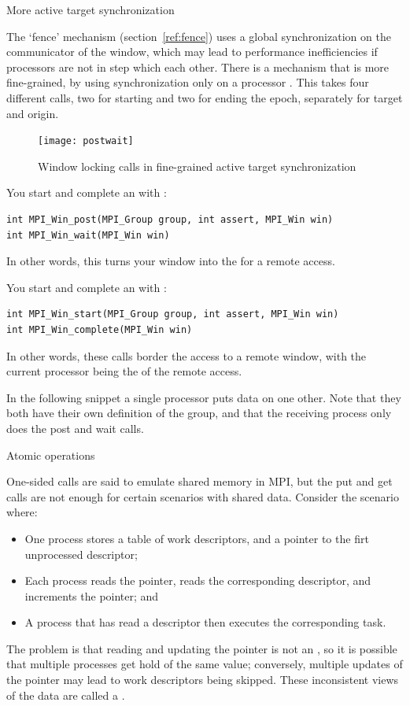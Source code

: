  {More active target synchronization}
\label{sec:ref:post-wait}

The `fence' mechanism (section~\ref{ref:fence}) uses a global synchronization on the
communicator of the window, which may 
lead to performance inefficiencies if processors are not in step which each other. 
There is a mechanism that is more fine-grained, by using synchronization only 
on a processor . This takes four different calls, two for starting
and two for ending the epoch, separately for target and origin.
\begin{figure}[ht]
  \texttt{[image: postwait]}
  \caption{Window locking calls in fine-grained active target synchronization}
  \label{fig:postwait}
\end{figure}

You start and complete an  with%
:
\begin{lstlisting}
int MPI_Win_post(MPI_Group group, int assert, MPI_Win win)
int MPI_Win_wait(MPI_Win win)
\end{lstlisting}
In other words, this turns your window into the  for a remote access.

You start and complete an  with%
:
\begin{lstlisting}
int MPI_Win_start(MPI_Group group, int assert, MPI_Win win)
int MPI_Win_complete(MPI_Win win)
\end{lstlisting}
In other words, these calls border the access to a remote window, with the current processor
being the  of the remote access.

In the following snippet a single processor puts data on one
other. Note that they both have their own definition of the group, and
that the receiving process only does the post and wait calls.
%

 {Atomic operations}

One-sided calls are said to emulate shared memory in MPI, but 
the put and get calls are not enough for certain scenarios with shared
data. Consider the scenario where:
\begin{itemize}
\item One process stores a table of work descriptors, and a pointer to
  the firt unprocessed descriptor;
\item Each process reads the pointer, reads the corresponding
  descriptor, and increments the pointer; and
\item A process that has read a descriptor then executes the
  corresponding task.
\end{itemize}
The problem is that reading and updating the pointer is not an
, so
it is possible that multiple processes get hold of the same value;
conversely, multiple updates of the pointer may lead to work
descriptors being skipped. These inconsistent views of the data are
called a .

